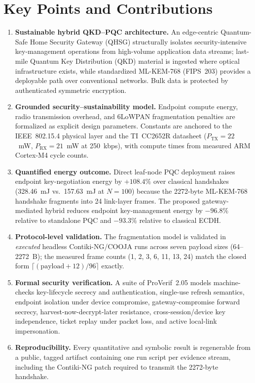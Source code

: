 \documentclass[11pt]{article}
\begin{document}
\section*{Key Points and Contributions}
\begin{enumerate}
  \item \textbf{Sustainable hybrid QKD--PQC architecture.} An edge-centric Quantum-Safe
  Home Security Gateway (QHSG) structurally isolates security-intensive key-management
  operations from high-volume application data streams; last-mile Quantum Key
  Distribution (QKD) material is ingested where optical infrastructure exists, while
  standardized ML-KEM-768 (FIPS~203) provides a deployable path over conventional
  networks. Bulk data is protected by authenticated symmetric encryption.

  \item \textbf{Grounded security--sustainability model.} Endpoint compute energy, radio
  transmission overhead, and 6LoWPAN fragmentation penalties are formalized as explicit
  design parameters. Constants are anchored to the IEEE~802.15.4 physical layer and the
  TI~CC2652R datasheet ($P_{\mathrm{TX}}{=}22$~mW, $P_{\mathrm{RX}}{=}21$~mW at
  250~kbps), with compute times from measured ARM Cortex-M4 cycle counts.

  \item \textbf{Quantified energy outcome.} Direct leaf-node PQC deployment raises
  endpoint key-negotiation energy by \textbf{$+108.4\%$} over classical handshakes
  (328.46~mJ vs.\ 157.63~mJ at $N{=}100$) because the 2272-byte ML-KEM-768 handshake
  fragments into 24 link-layer frames. The proposed gateway-mediated hybrid reduces
  endpoint key-management energy by \textbf{$-96.8\%$} relative to standalone PQC and
  \textbf{$-93.3\%$} relative to classical ECDH.

  \item \textbf{Protocol-level validation.} The fragmentation model is validated in
  \emph{executed} headless Contiki-NG/COOJA runs across seven payload sizes
  (64--2272~B); the measured frame counts (1, 2, 3, 6, 11, 13, 24) match the closed form
  $\lceil(\text{payload}+12)/96\rceil$ exactly.

  \item \textbf{Formal security verification.} A suite of ProVerif~2.05 models
  machine-checks key-lifecycle secrecy and authentication, single-use refresh semantics,
  endpoint isolation under device compromise, gateway-compromise forward secrecy,
  harvest-now-decrypt-later resistance, cross-session/device key independence, ticket
  replay under packet loss, and active local-link impersonation.

  \item \textbf{Reproducibility.} Every quantitative and symbolic result is regenerable
  from a public, tagged artifact containing one run script per evidence stream,
  including the Contiki-NG patch required to transmit the 2272-byte handshake.
\end{enumerate}
\end{document}
